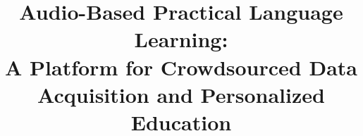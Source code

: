 \documentclass[a4paper]{article}
\title{Audio-Based Practical Language Learning:\\A Platform for Crowdsourced Data Acquisition and Personalized Education}
\begin{document}
\maketitle



%
%
%
%
%

\eightpt
  
  
  
\end{document}
